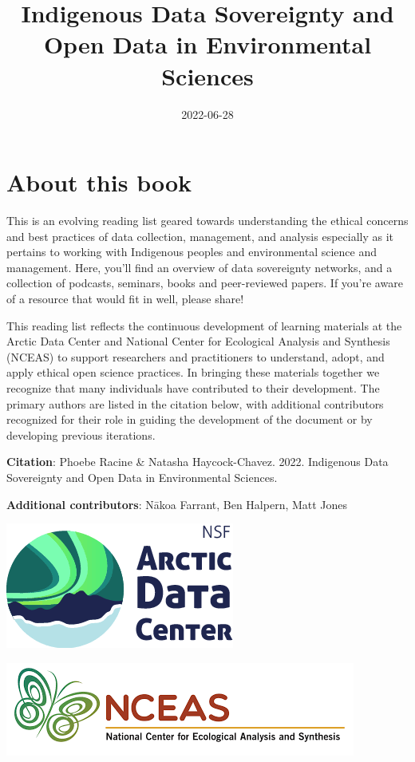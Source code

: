 \documentclass[
]{book}
\title{Indigenous Data Sovereignty and Open Data in Environmental Sciences}
\author{}
\date{\vspace{-2.5em}2022-06-28}
\begin{document}
\maketitle

{
\setcounter{tocdepth}{1}
\tableofcontents
}
\hypertarget{about-this-book}{%
\chapter*{About this book}\label{about-this-book}}

This is an evolving reading list geared towards understanding the ethical concerns and best practices of data collection, management, and analysis especially as it pertains to working with Indigenous peoples and environmental science and management. Here, you'll find an overview of data sovereignty networks, and a collection of podcasts, seminars, books and peer-reviewed papers. If you're aware of a resource that would fit in well, please share!

This reading list reflects the continuous development of learning materials at the Arctic Data Center and National Center for Ecological Analysis and Synthesis (NCEAS) to support researchers and practitioners to understand, adopt, and apply ethical open science practices. In bringing these materials together we recognize that many individuals have contributed to their development. The primary authors are listed in the citation below, with additional contributors recognized for their role in guiding the development of the document or by developing previous iterations.

\textbf{Citation}: Phoebe Racine \& Natasha Haycock-Chavez. 2022. Indigenous Data Sovereignty and Open Data in Environmental Sciences.

\textbf{Additional contributors}: Nākoa Farrant, Ben Halpern, Matt Jones

\includegraphics[width=0.49\linewidth]{images/adc_logo}

\includegraphics[width=0.49\linewidth]{images/nceas}
\end{document}
